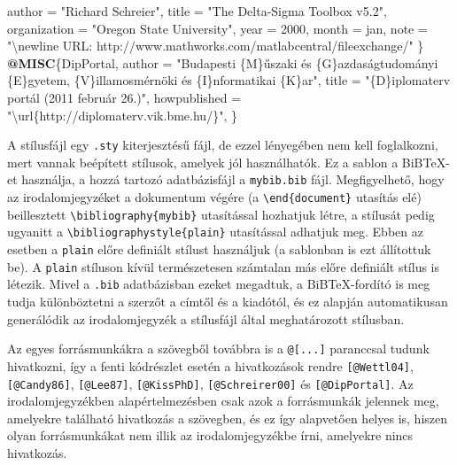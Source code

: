 \documentclass[11pt,magyar,a4paper,oneside,]{report}
\newenvironment{Shaded}{}{}
\newcommand{\KeywordTok}[1]{\textcolor[rgb]{0.00,0.44,0.13}{\textbf{{#1}}}}
\newcommand{\DataTypeTok}[1]{\textcolor[rgb]{0.56,0.13,0.00}{{#1}}}
\newcommand{\CharTok}[1]{\textcolor[rgb]{0.25,0.44,0.63}{{#1}}}
\newcommand{\StringTok}[1]{\textcolor[rgb]{0.25,0.44,0.63}{{#1}}}
\newcommand{\OtherTok}[1]{\textcolor[rgb]{0.00,0.44,0.13}{{#1}}}
\newcommand{\NormalTok}[1]{{#1}}
\begin{document}
\begin{Shaded}
\begin{Highlighting}[]
  \DataTypeTok{author} \NormalTok{= "}\StringTok{Richard Schreier}\NormalTok{",}
  \DataTypeTok{title} \NormalTok{= "}\StringTok{The Delta-Sigma Toolbox v5.2}\NormalTok{",}
  \DataTypeTok{organization} \NormalTok{= "}\StringTok{Oregon State University}\NormalTok{",}
  \DataTypeTok{year} \NormalTok{= 2000,}
  \DataTypeTok{month} \NormalTok{= }\StringTok{jan}\NormalTok{,}
  \DataTypeTok{note} \NormalTok{= "}\CharTok{\textbackslash{}newline}\StringTok{ URL: http://www.mathworks.com/matlabcentral/fileexchange/}\NormalTok{"}
\NormalTok{\}}
\KeywordTok{@MISC}\NormalTok{\{}\OtherTok{DipPortal}\NormalTok{,}
    \DataTypeTok{author} \NormalTok{= "}\StringTok{Budapesti \{M\}űszaki és \{G\}azdaságtudományi \{E\}gyetem, \{V\}illamosmérnöki és \{I\}nformatikai \{K\}ar}\NormalTok{",}
  \DataTypeTok{title} \NormalTok{= "}\StringTok{\{D\}iplomaterv portál (2011 február 26.)}\NormalTok{",}
  \DataTypeTok{howpublished} \NormalTok{= "}\CharTok{\textbackslash{}url}\StringTok{\{http://diplomaterv.vik.bme.hu/\}}\NormalTok{",}
\NormalTok{\}}
\end{Highlighting}
\end{Shaded}

A stílusfájl egy \texttt{.sty} kiterjesztésű fájl, de ezzel lényegében
nem kell foglalkozni, mert vannak beépített stílusok, amelyek jól
használhatók. Ez a sablon a BiB\TeX-et használja, a hozzá tartozó
adatbázisfájl a \texttt{mybib.bib} fájl. Megfigyelhető, hogy az
irodalomjegyzéket a dokumentum végére (a
\texttt{\textbackslash{}end\{document\}} utasítás elé) beillesztett
\texttt{\textbackslash{}bibliography\{mybib\}} utasítással hozhatjuk
létre, a stílusát pedig ugyanitt a
\texttt{\textbackslash{}bibliographystyle\{plain\}} utasítással adhatjuk
meg. Ebben az esetben a \texttt{plain} előre definiált stílust
használjuk (a sablonban is ezt állítottuk be). A \texttt{plain} stíluson
kívül természetesen számtalan más előre definiált stílus is létezik.
Mivel a \texttt{.bib} adatbázisban ezeket megadtuk, a BiB\TeX-fordító is
meg tudja különböztetni a szerzőt a címtől és a kiadótól, és ez alapján
automatikusan generálódik az irodalomjegyzék a stílusfájl által
meghatározott stílusban.

Az egyes forrásmunkákra a szövegből továbbra is a \texttt{@{[}...{]}}
paranccsal tudunk hivatkozni, így a fenti kódrészlet esetén a
hivatkozások rendre \texttt{{[}@Wettl04{]}}, \texttt{{[}@Candy86{]}},
\texttt{{[}@Lee87{]}}, \texttt{{[}@KissPhD{]}},
\texttt{{[}@Schreirer00{]}} és \texttt{{[}@DipPortal{]}}. Az
irodalomjegyzékben alapértelmezésben csak azok a forrásmunkák jelennek
meg, amelyekre található hivatkozás a szövegben, és ez így alapvetően
helyes is, hiszen olyan forrásmunkákat nem illik az irodalomjegyzékbe
írni, amelyekre nincs hivatkozás.
\end{document}
